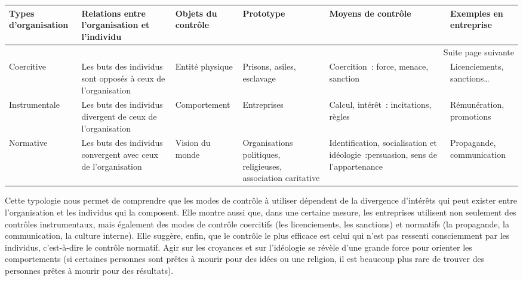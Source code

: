 \documentclass{tufte-handout}
\begin{document}
\begin{enumerate}
\begin{longtable}{|p{2cm}|p{3cm}|p{2cm}|p{2cm}|p{2cm}|p{2cm}|}
Types d'organisation & Relations entre l'organisation et l'individu & Objets du contrôle & Prototype & Moyens de contrôle & Exemples en entreprise \\

\hline
\endhead
\hline\multicolumn{6}{r}{Suite page suivante} \\
\endfoot
\endlastfoot
\hline
Coercitive & Les buts des individus sont opposés à ceux de l'organisation & Entité physique & Prisons, asiles, esclavage & Coercition : force, menace, sanction & Licenciements, sanctions\ldots{}\\
Instrumentale & Les buts des individus divergent de ceux de l'organisation & Comportement & Entreprises & Calcul, intérêt :  incitations, règles & Rémunération, promotions\\
Normative & Les buts des individus convergent avec ceux de l'organisation & Vision du monde & Organisations politiques, religieuses, association caritative & Identification, socialisation et idéologie :persuasion, sens de l'appartenance & Propagande, communication\\
\end{longtable}

Cette typologie nous permet de comprendre que les modes de contrôle à utiliser dépendent de la divergence d'intérêts qui peut exister entre l'organisation et les individus qui la composent. Elle montre aussi que, dans une certaine mesure, les entreprises utilisent non seulement des contrôles instrumentaux, mais également des modes de contrôle coercitifs (les licenciements, les sanctions) et normatifs (la propagande, la communication, la culture interne). Elle suggère, enfin, que le contrôle le plus efficace est celui qui n'est pas ressenti consciemment par les individus, c'est-à-dire le contrôle normatif. Agir sur les croyances et sur l'idéologie se révèle d'une grande force pour orienter les comportements (si certaines personnes sont prêtes à mourir pour des idées ou une religion, il est beaucoup plus rare de trouver des personnes prêtes à mourir pour des résultats).\\


\end{enumerate}
\end{document}
